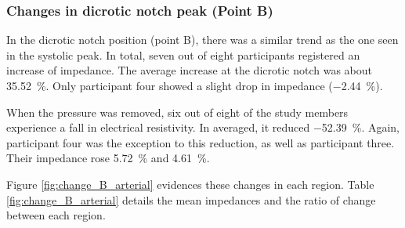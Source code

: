 \subsubsection{Changes in dicrotic notch peak (Point B)}
\label{section results 3.2.2}
In the dicrotic notch position (point B), there was a similar trend as the one seen in the systolic peak. In total, seven out of eight participants registered an increase of impedance. The average increase at the dicrotic notch was about \SI{35.52}{\percent}. Only participant four showed a  slight drop in impedance (\SI{-2.44}{\percent}).  

When the pressure was removed, six out of eight of the study members experience a fall in electrical resistivity. In averaged, it reduced \SI{-52.39}{\percent}. Again, participant four was the exception to this reduction, as well as participant three. Their impedance rose \SI{5.72}{\percent} and \SI{4.61}{\percent}.

Figure \ref{fig:change_B_arterial} evidences these changes in each region. Table \ref{fig:change_B_arterial} details the mean impedances and the ratio of change between each region.

